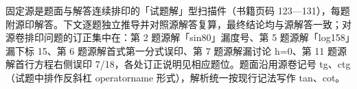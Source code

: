 

\begin{gktip}
固定源是题面与解答连续排印的「试题解」型扫描件（书籍页码 123—131），每题附源印解答。下文逐题独立推导并对照源解答复算，最终结论均与源解答一致；对源卷排印问题的订正集中在：第 2 题源解「sin80」漏度号、第 5 题源解「log158」漏下标 15、第 6 题源解首式第一分式误印、第 7 题源解漏讨论 h=0、第 11 题源解首行方程右侧误印 7/18，各处订正说明见相应题位。题面沿用源卷记号 tg、ctg（试题中排作反斜杠 operatorname 形式），解析统一按现行记法写作 tan、cot。
\end{gktip}

